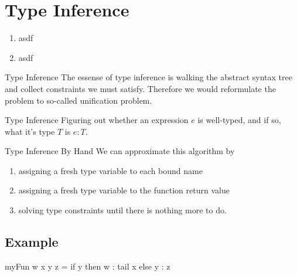 \documentclass[12pt]{book}
\begin{document}
\maketitle{}
\tableofcontents
{}
\listoffigures
\listoftables

\chapter{Type Inference}

\begin{enumerate}[label = {(\alph*)}]
	\item asdf
	\item asdf
\end{enumerate}

\begin{intuition}{Type Inference}
	The essense of type inference is walking the abstract syntax tree and
	collect constraints we must satisfy. Therefore we would reformulate the
	problem to so-called unification problem.
\end{intuition}

\begin{definition}{Type Inference}{}
	Figuring out whether an expression $e$ is well-typed, and if so, what it's
	type $T$ is $e: T$.
\end{definition}

\begin{definition}{Type Inference By Hand}{}
	We can approximate this algorithm by
	\begin{enumerate}
		\item assigning a fresh type variable to each bound name
		\item assigning a fresh type variable to the function return value
		\item solving type constraints until there is nothing more to do.
	\end{enumerate}
\end{definition}

\section{Example}
\begin{haskell}{}
	myFun w x y z = if y then w : tail x else y : z
\end{haskell}
\end{document}
